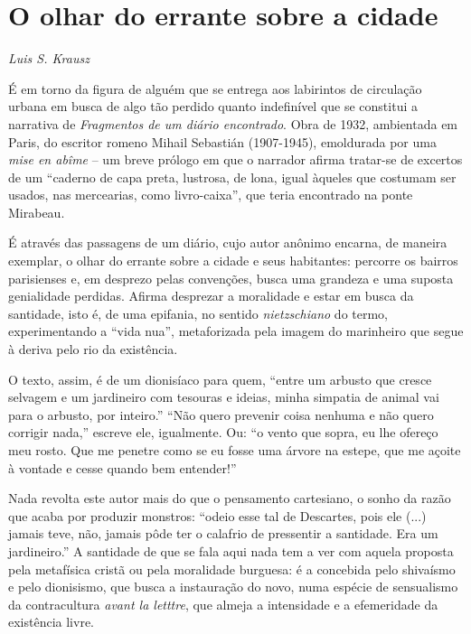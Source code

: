 \chapter*{O olhar do errante sobre a cidade}

\hfill\emph{Luis S. Krausz}

\bigskip

É em torno da figura de alguém que se entrega aos labirintos de
circulação urbana em busca de algo tão perdido quanto indefinível que se
constitui a narrativa de \emph{Fragmentos de um diário encontrado}. Obra
de 1932, ambientada em Paris, do escritor romeno Mihail Sebastián
(1907-1945), emoldurada por uma \emph{mise en abîme} -- um breve prólogo
em que o narrador afirma tratar-se de excertos de um ``caderno de capa
preta, lustrosa, de lona, igual àqueles que costumam ser usados, nas
mercearias, como livro-caixa'', que teria encontrado na ponte Mirabeau.

É através das passagens de um diário, cujo
autor anônimo encarna, de maneira exemplar, o olhar do errante sobre a
cidade e seus habitantes: percorre os bairros parisienses e, em desprezo
pelas convenções, busca uma grandeza e uma suposta genialidade perdidas.
Afirma desprezar a moralidade e estar em busca da santidade, isto é, de
uma epifania, no sentido \emph{nietzschiano} do termo, experimentando a
``vida nua'', metaforizada pela imagem do marinheiro que segue à deriva
pelo rio da existência.

O texto, assim, é de um dionisíaco para quem, ``entre um arbusto que
cresce selvagem e um jardineiro com tesouras e ideias, minha simpatia de
animal vai para o arbusto, por inteiro.'' ``Não quero prevenir coisa
nenhuma e não quero corrigir nada,'' escreve ele, igualmente. Ou: ``o
vento que sopra, eu lhe ofereço meu rosto. Que me penetre como se eu
fosse uma árvore na estepe, que me açoite à vontade e cesse quando bem
entender!''

Nada revolta este autor mais do que o pensamento cartesiano, o sonho da
razão que acaba por produzir monstros: ``odeio esse tal de Descartes,
pois ele (...) jamais teve, não, jamais pôde ter o calafrio de
pressentir a santidade. Era um jardineiro.'' A santidade de que se fala
aqui nada tem a ver com aquela proposta pela metafísica cristã ou pela
moralidade burguesa: é a concebida pelo shivaísmo e pelo dionisismo, que
busca a instauração do novo, numa espécie de sensualismo da
contracultura \emph{avant la letttre}, que almeja a intensidade e a
efemeridade da existência livre.

